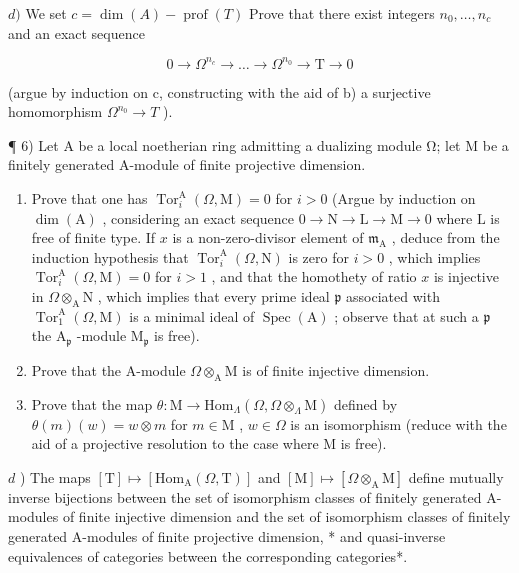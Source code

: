\(d)\) We set \(c = \dim(A) - \operatorname{prof}(T)\) Prove that there exist integers \(n_0, \ldots, n_c\) and an exact sequence

\[
0 \rightarrow \Omega^ {n _ {c}} \rightarrow \dots \rightarrow \Omega^ {n _ {0}} \rightarrow \mathrm{T} \rightarrow 0
\]

(argue by induction on c, constructing with the aid of b) a surjective homomorphism \(\Omega^{n_{0}} \to T\) ).

¶ 6) Let A be a local noetherian ring admitting a dualizing module Ω; let M be a finitely generated A-module of finite projective dimension.

\begin{enumerate}
\def\labelenumi{\alph{enumi})}
\item
  Prove that one has \(\operatorname{Tor}_{i}^{\mathrm{A}}(\Omega, \mathrm{M}) = 0\) for \(i > 0\) (Argue by induction on \(\dim(\mathrm{A})\) , considering an exact sequence \(0 \to \mathrm{N} \to \mathrm{L} \to \mathrm{M} \to 0\) where \(\mathrm{L}\) is free of finite type. If \(x\) is a non-zero-divisor element of \(\mathfrak{m}_{\mathrm{A}}\) , deduce from the induction hypothesis that \(\operatorname{Tor}_{i}^{\mathrm{A}}(\Omega, \mathrm{N})\) is zero for \(i > 0\) , which implies \(\operatorname{Tor}_{i}^{\mathrm{A}}(\Omega, \mathrm{M}) = 0\) for \(i > 1\) , and that the homothety of ratio \(x\) is injective in \(\Omega \otimes_{\mathrm{A}} \mathrm{N}\) , which implies that every prime ideal \(\mathfrak{p}\) associated with \(\operatorname{Tor}_{1}^{\mathrm{A}}(\Omega, \mathrm{M})\) is a minimal ideal of \(\operatorname{Spec}(\mathrm{A})\) ; observe that at such a \(\mathfrak{p}\) the \(\mathrm{A}_{\mathfrak{p}}\) -module \(\mathrm{M}_{\mathfrak{p}}\) is free).
\item
  Prove that the A-module \(\Omega\otimes_{\mathrm{A}}\mathrm{M}\) is of finite injective dimension.
\item
  Prove that the map \(\theta: \mathrm{M} \to \mathrm{Hom}_{\Lambda}(\Omega, \Omega \otimes_{\Lambda} \mathrm{M})\) defined by \(\theta(m)(w) = w \otimes m\) for \(m \in \mathrm{M}\) , \(w \in \Omega\) is an isomorphism (reduce with the aid of a projective resolution to the case where M is free).
\end{enumerate}

\(d\) ) The maps \([\mathrm{T}] \mapsto [\mathrm{Hom}_{\mathrm{A}}(\Omega, \mathrm{T})]\) and \([\mathrm{M}] \mapsto [\Omega \otimes_{\mathrm{A}} \mathrm{M}]\) define mutually inverse bijections between the set of isomorphism classes of finitely generated A-modules of finite injective dimension and the set of isomorphism classes of finitely generated A-modules of finite projective dimension, * and quasi-inverse equivalences of categories between the corresponding categories*.

